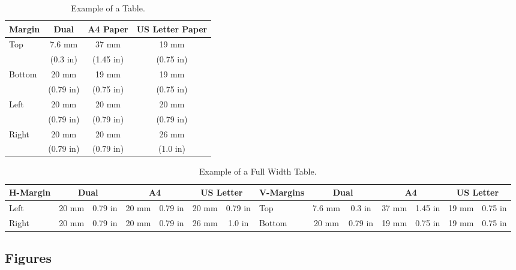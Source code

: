 \begin{table}[h]
\begin{center}
\caption{Example of a Table.}
\begin{tabular}{|l|c|c|c|}
\hline \textbf{Margin} & \textbf{Dual} & \textbf{A4 Paper} &
\textbf{US Letter Paper}
\\
\hline Top & 7.6 mm & 37 mm & 19 mm \\
 & (0.3 in) & (1.45 in) & (0.75 in) \\
\hline Bottom & 20 mm & 19 mm & 19 mm \\
 & (0.79 in) & (0.75 in)& (0.75 in) \\
\hline Left & 20 mm & 20 mm & 20 mm \\
 & (0.79 in) & (0.79 in) & (0.79 in) \\
\hline Right & 20 mm & 20 mm & 26 mm \\
 & (0.79 in) & (0.79 in) & (1.0 in) \\
\hline
\end{tabular}
\label{example_table}
\end{center}
\end{table}

\begin{table*}[t]
\begin{center}
\caption{Example of a Full Width Table.}
\begin{tabular}{|l|c|c|c|c|c|c||l|c|c|c|c|c|c|}
\hline \textbf{H-Margin} & \multicolumn{2}{c|}{\textbf{Dual}} & 
\multicolumn{2}{c|}{\textbf{A4}} &
\multicolumn{2}{c||}{\textbf{US Letter}} &
\textbf{V-Margins} & \multicolumn{2}{c|}{\textbf{Dual}} &
\multicolumn{2}{c|}{\textbf{A4}} &
\multicolumn{2}{c|}{\textbf{US Letter}} \\
\hline 
Left & 20 mm & 0.79 in & 20 mm & 0.79 in & 20 mm & 0.79 in &
Top & 7.6 mm & 0.3 in & 37 mm & 1.45 in & 19 mm & 0.75 in \\
\hline 
Right & 20 mm & 0.79 in & 20 mm & 0.79 in & 26 mm & 1.0 in &
Bottom & 20 mm & 0.79 in  & 19 mm & 0.75 in & 19 mm & 0.75 in \\
\hline
\end{tabular}
\label{example_table_2col}
\end{center}
\end{table*}

\subsection{Figures}

